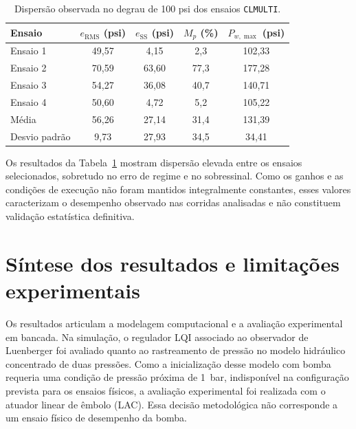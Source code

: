 \begin{table}[htbp]
    \centering
    \caption{Dispersão observada no degrau de 100 psi dos ensaios \texttt{CLMULTI}.}
    \label{tab:resultado-final-clmulti-repetibilidade}
    \begin{tabular}{l c c c c}
        \toprule
        Ensaio & $e_{\mathrm{RMS}}$ (psi) & $e_{\mathrm{SS}}$ (psi) & $M_p$ (\%) & $P_{w,\max}$ (psi) \\
        \midrule
        Ensaio 1 & 49,57 & 4,15 & 2,3 & 102,33 \\
        Ensaio 2 & 70,59 & 63,60 & 77,3 & 177,28 \\
        Ensaio 3 & 54,27 & 36,08 & 40,7 & 140,71 \\
        Ensaio 4 & 50,60 & 4,72 & 5,2 & 105,22 \\
        \midrule
        Média & 56,26 & 27,14 & 31,4 & 131,39 \\
        Desvio padrão & 9,73 & 27,93 & 34,5 & 34,41 \\
        \bottomrule
    \end{tabular}
\end{table}

Os resultados da Tabela~\ref{tab:resultado-final-clmulti-repetibilidade} mostram dispersão elevada entre os ensaios selecionados, sobretudo no erro de regime e no sobressinal. Como os ganhos e as condições de execução não foram mantidos integralmente constantes, esses valores caracterizam o desempenho observado nas corridas analisadas e não constituem validação estatística definitiva.


\section{Síntese dos resultados e limitações experimentais}
\label{sec:resultado-final-sintese}

Os resultados articulam a modelagem computacional e a avaliação experimental em bancada. Na simulação, o regulador LQI associado ao observador de Luenberger foi avaliado quanto ao rastreamento de pressão no modelo hidráulico concentrado de duas pressões. Como a inicialização desse modelo com bomba requeria uma condição de pressão próxima de 1~bar, indisponível na configuração prevista para os ensaios físicos, a avaliação experimental foi realizada com o atuador linear de êmbolo (LAC). Essa decisão metodológica não corresponde a um ensaio físico de desempenho da bomba.


